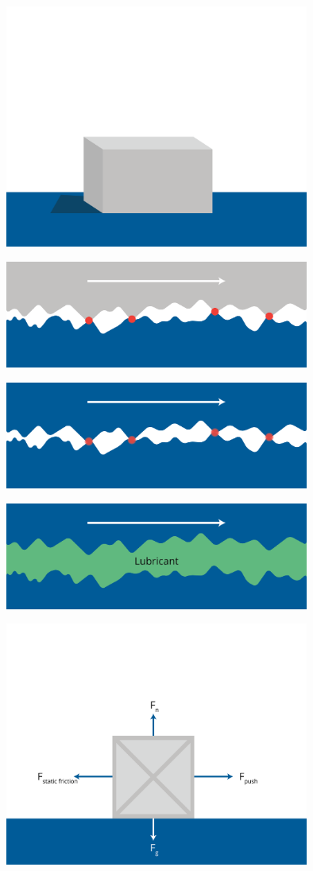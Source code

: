 \includegraphics[width=0.75\textwidth]{friction-02.png}

\includegraphics[width=0.75\textwidth]{friction-03.png}

\includegraphics[width=0.75\textwidth]{friction-04.png}

\includegraphics[width=0.75\textwidth]{friction-05.png}

\includegraphics[width=0.75\textwidth]{friction-06.png}

